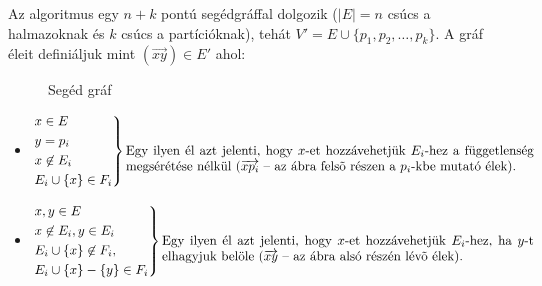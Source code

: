 Az algoritmus egy $n+k$ pontú segédgráffal dolgozik ($|E|=n$ csúcs a halmazoknak
és $k$ csúcs a partícióknak), tehát $V' = E \cup \{p_1, p_2, \ldots, p_k\}$. A
gráf éleit definiáljuk mint $(\overrightarrow{xy}) \in E'$ ahol:

\begin{figure}[htbp]
\caption{Segéd gráf}
\label{fig:MPP_graf}
\centering {} 
\end{figure}


\begin{itemize}
  \item  $\begin{rcases}
  x \in E \\
  y = p_i  \\
  x \not \in E_i\\
  E_i \cup  \{x\}  \in  F_i \end{rcases}
  \parbox[t]{11cm}{Egy ilyen él azt jelenti, hogy $x$-et hozzávehetjük $E_i$-hez
   a függetlenség megsérétése nélkül ($\overrightarrow{xp_i}$ -- az ábra felsõ
  részen a $p_i$-kbe mutató élek).}$
  \item $\begin{rcases}
  x,y \in E \\
  x \not\in E_i, y \in E_i\\
   E_i \cup \{x\} \not\in F_i,\\ 
   E_i \cup \{x\} - \{y\} \in F_i
  \end{rcases} \parbox[t]{10cm}{Egy ilyen él azt jelenti, hogy $x$-et
  hozzávehetjük $E_i$-hez, ha $y$-t elhagyjuk belöle ($\overrightarrow{xy}$ --
  az ábra alsó részén lévõ élek).}$
\end{itemize}

